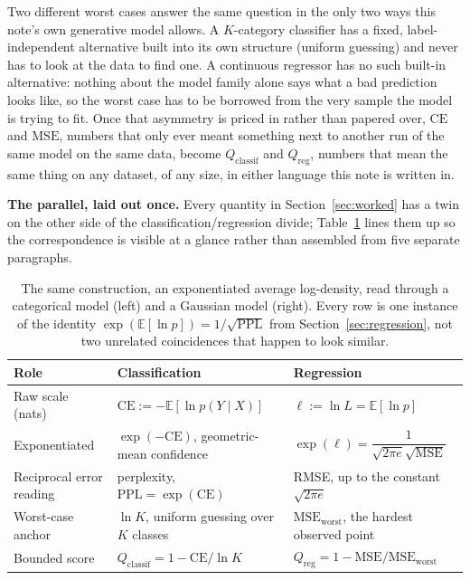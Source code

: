 \documentclass[11pt]{article}
\begin{document}
Two different worst cases answer the same question in the only two
ways this note's own generative model allows. A $K$-category classifier
has a fixed, label-independent alternative built into its own
structure (uniform guessing) and never has to look at the data to find
one. A continuous regressor has no such built-in alternative: nothing
about the model family alone says what a bad prediction looks like, so
the worst case has to be borrowed from the very sample the model is
trying to fit. Once that asymmetry is priced in rather than papered
over, $\mathrm{CE}$ and $\mathrm{MSE}$, numbers that only ever meant
something next to another run of the same model on the same data,
become $Q_{\text{classif}}$ and $Q_{\text{reg}}$, numbers that mean the
same thing on any dataset, of any size, in either language this note
is written in.

\textbf{The parallel, laid out once.} Every quantity in
Section~\ref{sec:worked} has a twin on the other side of the
classification/regression divide; Table~\ref{tab:parallel} lines them
up so the correspondence is visible at a glance rather than assembled
from five separate paragraphs.

\begin{table}[H]
\centering
\small
\begin{tabular}{@{}lll@{}}
\toprule
Role & Classification & Regression \\
\midrule
Raw scale (nats) & $\mathrm{CE} := -\mathbb E[\ln p(Y\mid X)]$ &
  $\ell := \ln L = \mathbb E[\ln p]$ \\
Exponentiated & $\exp(-\mathrm{CE})$, geometric-mean confidence &
  $\exp(\ell) = \dfrac{1}{\sqrt{2\pi e}\sqrt{\mathrm{MSE}}}$ \\
Reciprocal error reading & perplexity, $\mathrm{PPL} = \exp(\mathrm{CE})$ &
  RMSE, up to the constant $\sqrt{2\pi e}$ \\
Worst-case anchor & $\ln K$, uniform guessing over $K$ classes &
  $\mathrm{MSE}_{\text{worst}}$, the hardest observed point \\
Bounded score & $Q_{\text{classif}} = 1 - \mathrm{CE}/\ln K$ &
  $Q_{\text{reg}} = 1 - \mathrm{MSE}/\mathrm{MSE}_{\text{worst}}$ \\
\bottomrule
\end{tabular}
\caption{The same construction, an exponentiated average log-density,
read through a categorical model (left) and a Gaussian model (right).
Every row is one instance of the identity $\exp(\mathbb E[\ln p]) =
1/\sqrt{\mathrm{PPL}}$ from Section~\ref{sec:regression}, not two
unrelated coincidences that happen to look similar.}
\label{tab:parallel}
\end{table}
\end{document}
